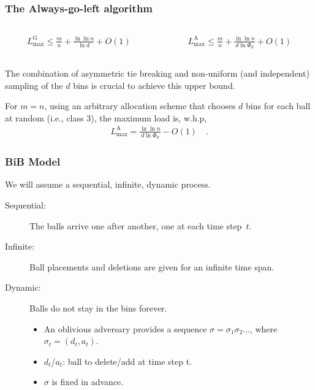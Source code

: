 \documentclass[serif,professionalfonts]{beamer}
\newcommand\load{L_{\mathrm{max}}}
\newcommand\loadG{\load^{\mathrm{G}}}
\newcommand\loadAgl{\load^{\mathrm{A}}}
\begin{document}
\begin{frame}
\frametitle{The Always-go-left algorithm}
\begin{columns}[onlytextwidth]
\begin{column}{0.5\textwidth}
\begin{align*}
\loadG \leq \frac{m}{n} + \frac{\ln \ln n}{\ln d} + O(1) 
\end{align*}
\end{column}
\begin{column}{0.5\textwidth}
\begin{align*}
\loadAgl \leq \frac{m}{n} + \frac{\ln \ln n}{d \ln \Phi_d} + O(1)
\end{align*}
\end{column}
\end{columns}
\bigskip
The combination of \alert{asymmetric tie breaking} and \alert{non-uniform} (and independent) sampling of the $d$ bins is crucial to achieve this upper bound.
\bigskip
\begin{theorem}[V\"ocking, 2003]
For $m=n$, using an arbitrary allocation scheme that chooses $d$ bins for each ball at random (i.e., class 3), the maximum load is, w.h.p,
\begin{align*}
\loadAgl = \frac{\ln \ln n}{d \ln \Phi_d} - O(1) \quad .
\end{align*}
\end{theorem}
\end{frame}

\begin{frame}
\frametitle{BiB Model}
We will assume a sequential, infinite, dynamic process.

\begin{description}
\item[Sequential:] The balls arrive one after another, one at each time step~$t$.
\item[Infinite:] Ball placements and deletions are given for an infinite time span.
\item[Dynamic:] Balls do not stay in the bins forever.
\begin{itemize}
\item An oblivious adversary provides a sequence $\sigma = \sigma_1 \sigma_2 \dots$, where $\sigma_t = (d_t, a_t)$.
\item $d_t$/$a_t$: ball to delete/add at time step t. \\
\item $\sigma$ is fixed in advance.
\end{itemize}
\end{description}
\end{frame}
\end{document}
